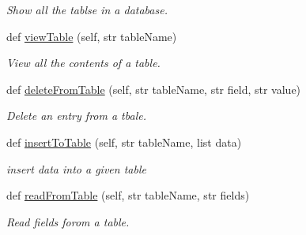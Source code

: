 \begin{DoxyCompactItemize}
\begin{DoxyCompactList}\small\item\em Show all the tablse in a database. \end{DoxyCompactList}\item 
\mbox{\label{classsql_handler_1_1_sql_table_handler_ac163d7adefd1e0fa1822af9573f7f17f}} 
def \mbox{\hyperlink{classsql_handler_1_1_sql_table_handler_ac163d7adefd1e0fa1822af9573f7f17f}{view\+Table}} (self, str table\+Name)
\begin{DoxyCompactList}\small\item\em View all the contents of a table. \end{DoxyCompactList}\item 
\mbox{\label{classsql_handler_1_1_sql_table_handler_a2df898628c21609eac4d07a57da5c01e}} 
def \mbox{\hyperlink{classsql_handler_1_1_sql_table_handler_a2df898628c21609eac4d07a57da5c01e}{delete\+From\+Table}} (self, str table\+Name, str field, str value)
\begin{DoxyCompactList}\small\item\em Delete an entry from a tbale. \end{DoxyCompactList}\item 
\mbox{\label{classsql_handler_1_1_sql_table_handler_abb045e0eb6c1d6c5cb737938f7e25080}} 
def \mbox{\hyperlink{classsql_handler_1_1_sql_table_handler_abb045e0eb6c1d6c5cb737938f7e25080}{insert\+To\+Table}} (self, str table\+Name, list data)
\begin{DoxyCompactList}\small\item\em insert data into a given table \end{DoxyCompactList}\item 
\mbox{\label{classsql_handler_1_1_sql_table_handler_a38b741237173d13702d3e33f245617c7}} 
def \mbox{\hyperlink{classsql_handler_1_1_sql_table_handler_a38b741237173d13702d3e33f245617c7}{read\+From\+Table}} (self, str table\+Name, str fields)
\begin{DoxyCompactList}\small\item\em Read fields forom a table. \end{DoxyCompactList}\item 
\mbox{\label{classsql_handler_1_1_sql_table_handler_aaba3f0eabad64b67ba40c82d4f7767ae}} 

\end{DoxyCompactItemize}
